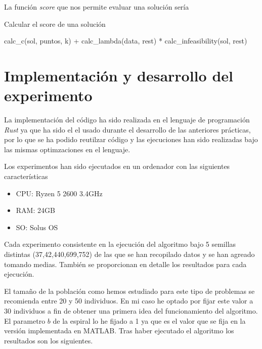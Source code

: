 \documentclass[11pt]{article}
\begin{document}
  
  La función \textit{score} que nos permite evaluar una
  solución sería
  
  \begin{algorithm}[H]
  \caption{Calcular el score de una solución}
  \label{score}
  \begin{algorithmic}[1]
    \State \Return calc\_c(sol, puntos, k) + calc\_lambda(data, rest) * calc\_infeasibility(sol, rest)
    \EndProcedure
  \end{algorithmic}
  \end{algorithm}

\section{Implementación y desarrollo del experimento}

La implementación del código ha sido realizada en el lenguaje de programación
\textit{Rust} ya que ha sido el el usado durante el desarrollo de las anteriores
prácticas, por lo que se ha podido reutilzar código y las ejecuciones han sido
realizadas bajo las mismas optimzaciones en el lenguaje.

Los experimentos han sido ejecutados en un ordenador con las siguientes
características

\begin{itemize}
  \item CPU: Ryzen 5 2600 3.4GHz
  \item RAM: 24GB
  \item SO: Solus OS
\end{itemize}

Cada experimento consistente en la ejecución del algoritmo bajo 5 semillas
distintas (37,42,440,699,752) de las que se han recopilado datos y se han
agreado tomando medias. También se proporcionan en detalle los resultados para
cada ejecución.

El tamaño de la población como hemos estudiado para este tipo de problemas se
recomienda entre 20 y 50 individuos. En mi caso he optado por fijar este valor a
30 individuos a fin de obtener una primera idea del funcionamiento del
algoritmo. El parametro $b$ de la espiral lo he fijado a 1 ya que es el valor
que se fija en la versión implementada en MATLAB. Tras haber
ejecutado el algoritmo los resultados son los siguientes.



\end{document}
